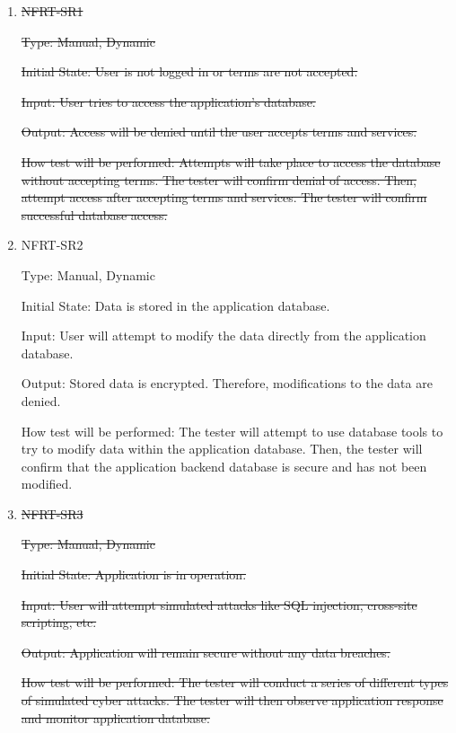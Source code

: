 \documentclass[12pt, titlepage]{article}
\begin{document}
\begin{enumerate}
\item{\sout{NFRT-SR1\\}}

\sout{Type: Manual, Dynamic}

\sout{Initial State: User is not logged in or terms are not accepted.}
                
\sout{Input: User tries to access the application's database.}
                
\sout{Output: Access will be denied until the user accepts terms and services.}
                
\sout{How test will be performed: Attempts will take place to access the database without accepting terms. The tester will confirm denial of access. Then, attempt access after accepting terms and services. The tester will confirm successful database access.}

\item{NFRT-SR2\\}

Type: Manual, Dynamic

Initial State: Data is stored in the application database.
                
Input: User will attempt to modify the data directly from the application database.
                
Output: Stored data is encrypted. Therefore, modifications to the data are denied.
                
How test will be performed: The tester will attempt to use database tools to try to modify data within the application database. Then, the tester will confirm that the application backend database is secure and has not been modified.

\item{\sout{NFRT-SR3\\}}

\sout{Type: Manual, Dynamic}

\sout{Initial State: Application is in operation.}
                
\sout{Input: User will attempt simulated attacks like SQL injection, cross-site scripting, etc.}
                
\sout{Output: Application will remain secure without any data breaches.}
                
\sout{How test will be performed: The tester will conduct a series of different types of simulated cyber attacks. The tester will then observe application response and monitor application database.}


\end{enumerate}
\end{document}
